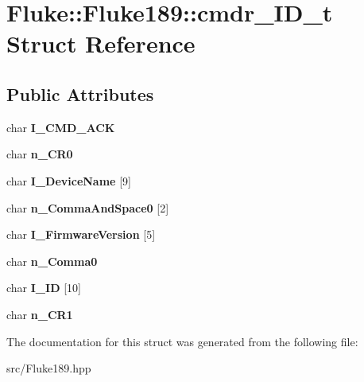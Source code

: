 \hypertarget{structFluke_1_1Fluke189_1_1cmdr__ID__t}{
\section{Fluke::Fluke189::cmdr\_\-ID\_\-t Struct Reference}
\label{structFluke_1_1Fluke189_1_1cmdr__ID__t}
}
\subsection*{Public Attributes}
\begin{DoxyCompactItemize}
\item 
\hypertarget{structFluke_1_1Fluke189_1_1cmdr__ID__t_a7d63c9116d51d36eb03dd62e2b7a32c2}{
char {\bfseries I\_\-CMD\_\-ACK}}
\label{structFluke_1_1Fluke189_1_1cmdr__ID__t_a7d63c9116d51d36eb03dd62e2b7a32c2}

\item 
\hypertarget{structFluke_1_1Fluke189_1_1cmdr__ID__t_a2e053c2ef8d2444925eacc5ed6525e23}{
char {\bfseries n\_\-CR0}}
\label{structFluke_1_1Fluke189_1_1cmdr__ID__t_a2e053c2ef8d2444925eacc5ed6525e23}

\item 
\hypertarget{structFluke_1_1Fluke189_1_1cmdr__ID__t_af64add63da87318b73fb3d33be0579bf}{
char {\bfseries I\_\-DeviceName} \mbox{[}9\mbox{]}}
\label{structFluke_1_1Fluke189_1_1cmdr__ID__t_af64add63da87318b73fb3d33be0579bf}

\item 
\hypertarget{structFluke_1_1Fluke189_1_1cmdr__ID__t_a091738bf2dabd1d9a6c96eb4fb30060d}{
char {\bfseries n\_\-CommaAndSpace0} \mbox{[}2\mbox{]}}
\label{structFluke_1_1Fluke189_1_1cmdr__ID__t_a091738bf2dabd1d9a6c96eb4fb30060d}

\item 
\hypertarget{structFluke_1_1Fluke189_1_1cmdr__ID__t_a42650884119166ca70415cde54854f68}{
char {\bfseries I\_\-FirmwareVersion} \mbox{[}5\mbox{]}}
\label{structFluke_1_1Fluke189_1_1cmdr__ID__t_a42650884119166ca70415cde54854f68}

\item 
\hypertarget{structFluke_1_1Fluke189_1_1cmdr__ID__t_a10aa8b9107b58b67e7c0c32e4f0fc6df}{
char {\bfseries n\_\-Comma0}}
\label{structFluke_1_1Fluke189_1_1cmdr__ID__t_a10aa8b9107b58b67e7c0c32e4f0fc6df}

\item 
\hypertarget{structFluke_1_1Fluke189_1_1cmdr__ID__t_ab4cac5db4089e42498abcdbb858065d2}{
char {\bfseries I\_\-ID} \mbox{[}10\mbox{]}}
\label{structFluke_1_1Fluke189_1_1cmdr__ID__t_ab4cac5db4089e42498abcdbb858065d2}

\item 
\hypertarget{structFluke_1_1Fluke189_1_1cmdr__ID__t_a536695fd7989622726a720403841d119}{
char {\bfseries n\_\-CR1}}
\label{structFluke_1_1Fluke189_1_1cmdr__ID__t_a536695fd7989622726a720403841d119}

\end{DoxyCompactItemize}


The documentation for this struct was generated from the following file:\begin{DoxyCompactItemize}
\item 
src/Fluke189.hpp\end{DoxyCompactItemize}
